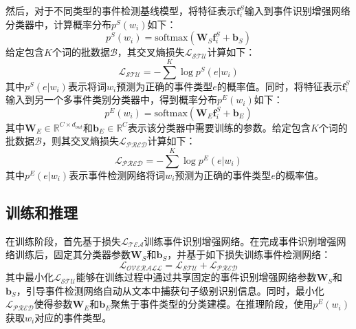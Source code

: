 然后，对于不同类型的事件检测基线模型，将特征表示$\boldsymbol{f}_i^{S}$输入到事件识别增强网络分类器中，计算概率分布$p^{S}\left(w_{i}\right)$如下：
\begin{equation}
  p^{S}\left(w_{i}\right) = \textrm{softmax}\left(\boldsymbol{W}_{S}\boldsymbol{f}_i^{S} + \boldsymbol{b}_{S}\right)
\end{equation}
给定包含$K$个词的批数据$\mathcal{B}$，其交叉熵损失$\mathcal{L_\textrm{STU}}$计算如下：
\begin{equation}
  \mathcal{L_\textrm{STU}} = -\sum^{K} \log p^{S}\left(e|w_{i}\right)
\end{equation}
其中$p^{S}\left(e|w_{i}\right)$表示将词$w_{i}$预测为正确的事件类型$e$的概率值。同时，将特征表示$\boldsymbol{f}_i^{S}$输入到另一个多事件类别分类器中，得到概率分布$p^{E}\left(w_{i}\right)$如下：
\begin{equation}
  p^{E}\left(w_{i}\right) = \textrm{softmax}\left(\boldsymbol{W}_{E}\boldsymbol{f}_i^{S} + \boldsymbol{b}_{E}\right)
\end{equation}
其中$\boldsymbol{W}_{E} \in {\mathbb{R}}^{C \times d_{out}}$和$\boldsymbol{b}_{E} \in {\mathbb{R}}^{C}$表示该分类器中需要训练的参数。给定包含$K$个词的批数据$\mathcal{B}$，则其交叉熵损失$\mathcal{L_\textrm{PRED}}$计算如下：
\begin{equation}
  \mathcal{L_\textrm{PRED}} = -\sum^{K} \log p^{E}\left(e|w_{i}\right)
 \label{ce}
\end{equation}
其中$p^{E}\left(e|w_{i}\right)$表示事件检测网络将词$w_{i}$预测为正确的事件类型$e$的概率值。

\subsection{训练和推理}
在训练阶段，首先基于损失$\mathcal{L_\textrm{TEA}}$训练事件识别增强网络。在完成事件识别增强网络训练后，固定其分类器参数$\boldsymbol{W}_{S}$和$\boldsymbol{b}_{S}$，并基于如下损失训练事件检测网络：
\begin{equation}
  \mathcal{L_\textrm{OVERALL}} = \mathcal{L_\textrm{STU}} + \mathcal{L_\textrm{PRED}}
  \label{overall_stu}
\end{equation}
其中最小化$\mathcal{L_\textrm{STU}}$能够在训练过程中通过共享固定的事件识别增强网络参数$\boldsymbol{W}_{S}$和$\boldsymbol{b}_{S}$，引导事件检测网络自动从文本中捕获句子级别识别信息。同时，最小化$\mathcal{L_\textrm{PRED}}$使得参数$\boldsymbol{W}_{E}$和$\boldsymbol{b}_{E}$聚焦于事件类型的分类建模。在推理阶段，使用$p^{E}\left(w_{i}\right)$获取$w_{i}$对应的事件类型。

